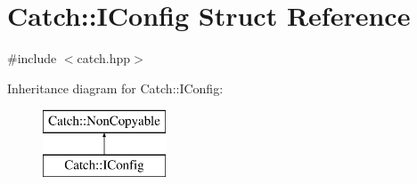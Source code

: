 \hypertarget{struct_catch_1_1_i_config}{}\section{Catch\+:\+:I\+Config Struct Reference}
\label{struct_catch_1_1_i_config}


{\ttfamily \#include $<$catch.\+hpp$>$}

Inheritance diagram for Catch\+:\+:I\+Config\+:\begin{figure}[H]
\begin{center}
\leavevmode
\includegraphics[height=2.000000cm]{struct_catch_1_1_i_config}
\end{center}
\end{figure}

